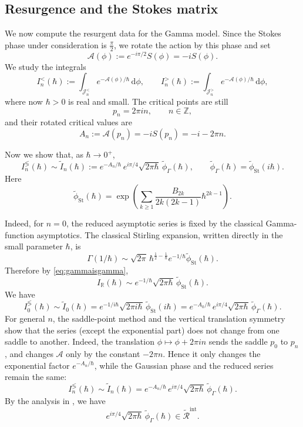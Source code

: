 \documentclass[11pt]{amsart}
\theoremstyle{plain}
\newcommand{\R}{\mathbb R}
\newcommand{\Z}{\mathbb Z}
\newcommand{\dd}{\mathrm d}
\newcommand{\J}{\mathcal J}
\begin{document}
\smallskip
\subsection{Resurgence and the Stokes matrix}

We now compute the resurgent data for the Gamma model.  Since the Stokes phase under consideration is $\frac{\pi}{2}$, we rotate the action by this phase and set
\[
\mathcal A(\phi):=e^{-i\pi/2}S(\phi)=-iS(\phi).
\]
We study the integrals
\[
I_n^{<}(\hbar):=\int_{\J_n^{<}} e^{-\mathcal A(\phi)/\hbar}\,\dd\phi,
\qquad
I_n^{>}(\hbar):=\int_{\J_n^{>}} e^{-\mathcal A(\phi)/\hbar}\,\dd\phi,
\]
where now \(\hbar>0\) is real and small.  The critical points are still
\[
p_n=2\pi i n,
\qquad n\in\Z,
\]
and their rotated critical values are
\[
A_n:=\mathcal A(p_n)=-iS(p_n)=-i-2\pi n.
\]

Now we show that, as \(\hbar\to0^+\),
\begin{equation*}\label{eq:gamma-formal-saddle-expansion}
I_n^{\lessgtr}(\hbar)
\sim
\widetilde I_n(\hbar)
:=
e^{-A_n/\hbar}\,
e^{i\pi/4}\sqrt{2\pi\hbar}\,
\widetilde\phi_\Gamma(\hbar),
\qquad
\widetilde\phi_\Gamma(\hbar)
=
\widetilde\phi_{\mathrm{St}}(i\hbar).
\end{equation*}
Here
\begin{equation*}\label{eq:gamma-stirling-series-closed}
\widetilde\phi_{\mathrm{St}}(\hbar)
=
\exp\left(
\sum_{k\ge1}
\frac{B_{2k}}{2k(2k-1)}\hbar^{2k-1}
\right).
\end{equation*}

Indeed, for \(n=0\), the reduced asymptotic series is fixed by the classical Gamma-function asymptotics. The classical Stirling expansion, written directly in the small parameter \(\hbar\), is
\[
\Gamma(1/\hbar)
\sim
\sqrt{2\pi}\,
\hbar^{\frac12-\frac1\hbar}
e^{-1/\hbar}
\widetilde\phi_{\mathrm{St}}(\hbar).
\]
Therefore by \eqref{eq:gammaisgamma},
\[
I_{\R}(\hbar)
\sim
e^{-1/\hbar}\sqrt{2\pi\hbar}\,
\widetilde\phi_{\mathrm{St}}(\hbar).
\]
We have
\begin{equation*}
I_0^{\lessgtr}(\hbar)
\sim
\widetilde I_0(\hbar)
=
e^{-1/i\hbar}\sqrt{2\pi i\hbar}\,
\widetilde\phi_{\mathrm{St}}(i\hbar)
=
e^{-A_0/\hbar}\,
e^{i\pi/4}\sqrt{2\pi\hbar}\,
\widetilde\phi_\Gamma(\hbar).
\end{equation*}
For general \(n\), the saddle-point method and the vertical translation symmetry show that the series (except the exponential part) does not change from one saddle to another.  Indeed, the translation \(\phi\mapsto \phi+2\pi i n\) sends the saddle \(p_0\) to \(p_n\), and changes \(\mathcal A\) only by the constant \(-2\pi n\).  Hence it only changes the exponential factor \(e^{-A_n/\hbar}\), while the Gaussian phase and the reduced series remain the same:
\[
I_n^{\lessgtr}(\hbar)
\sim
\widetilde I_n(\hbar)
=
e^{-A_n/\hbar}\,
e^{i\pi/4}\sqrt{2\pi\hbar}\,
\widetilde\phi_\Gamma(\hbar).
\]
By the analysis in 
\cite[Theorem~1 and the paragraph between (3.7) and (3.8)]{Sauzin2021Gamma}, we have
\[
e^{i\pi/4}\sqrt{2\pi\hbar}\,
\widetilde\phi_\Gamma(\hbar)
\in
\widetilde{\mathcal R}^{\mathrm{int}}.
\]
\end{document}
